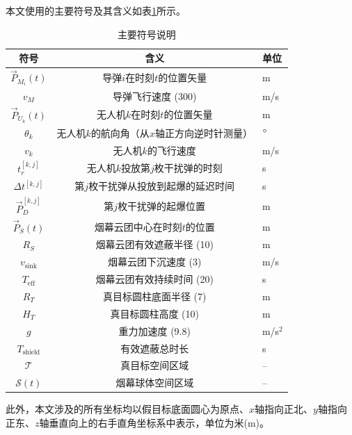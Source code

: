 
本文使用的主要符号及其含义如表\ref{tab:symbols}所示。

\begin{table}[H]
    \centering
    \caption{主要符号说明}
    \label{tab:symbols}
    \begin{tabular}{ccl}
        \toprule
        \textbf{符号} & \textbf{含义} & \textbf{单位} \\
        \midrule
        $\vec{P}_{M_i}(t)$ & 导弹$i$在时刻$t$的位置矢量 & m \\
        $v_M$ & 导弹飞行速度 (300) & m/s \\
        $\vec{P}_{U_k}(t)$ & 无人机$k$在时刻$t$的位置矢量 & m \\
        $\theta_k$ & 无人机$k$的航向角（从$x$轴正方向逆时针测量） & $\degree$ \\
        $v_k$ & 无人机$k$的飞行速度 & m/s \\
        $t_{r}^{[k,j]}$ & 无人机$k$投放第$j$枚干扰弹的时刻 & s \\
        $\Delta t^{[k,j]}$ & 第$j$枚干扰弹从投放到起爆的延迟时间 & s \\
        $\vec{P}_{D}^{[k,j]}$ & 第$j$枚干扰弹的起爆位置 & m \\
        $\vec{P}_{S}(t)$ & 烟幕云团中心在时刻$t$的位置 & m \\
        $R_S$ & 烟幕云团有效遮蔽半径 (10) & m \\
        $v_{\text{sink}}$ & 烟幕云团下沉速度 (3) & m/s \\
        $T_{\text{eff}}$ & 烟幕云团有效持续时间 (20) & s \\
        $R_T$ & 真目标圆柱底面半径 (7) & m \\
        $H_T$ & 真目标圆柱高度 (10) & m \\
        $g$ & 重力加速度 (9.8) & m/s$^2$ \\
        $T_{\text{shield}}$ & 有效遮蔽总时长 & s \\
        $\mathcal{T}$ & 真目标空间区域 & -- \\
        $\mathcal{S}(t)$ & 烟幕球体空间区域 & -- \\
        \bottomrule
    \end{tabular}
\end{table}

此外，本文涉及的所有坐标均以假目标底面圆心为原点、$x$轴指向正北、$y$轴指向正东、$z$轴垂直向上的右手直角坐标系中表示，单位为米(m)。
